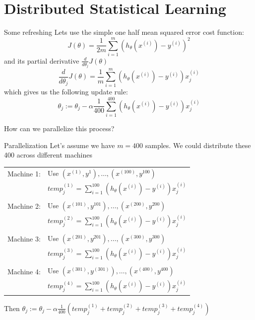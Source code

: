 \documentclass{beamer}
\begin{document}
\section{Distributed Statistical Learning}
\label{sec:distributed_statistical_learning}

\begin{frame}{Some refreshing}
  \tiny
  Lets use the simple one half mean squared error cost function: 
  \begin{equation}
    J(\theta) = \frac{1}{2m} \sum^m_{i=1} (h_{\theta}(x^{(i)}) - y^{(i)})^2
  \end{equation}
  and its partial derivative $\frac{d}{d\theta_j}J(\theta)$
  \begin{equation}
    \frac{d}{d\theta_j}J(\theta) = \frac{1}{m}\sum^{m}_{i=1}(h_{\theta}(x^{(i)})- y^{(i)})x_j^{(i)}
  \end{equation}
  which gives us the following update rule:
  \begin{equation}
    \theta_j := \theta_j - \alpha \frac{1}{400}\sum^{400}_{i=1}(h_{\theta}(x^{(i)})- y^{(i)})x_j^{(i)}
  \end{equation}

  {\large How can we parallelize this process?}

\end{frame}

\begin{frame}[t]{Parallelization}
  \small
  Let's assume we have $m=400$ samples. We could distribute these 400 across different machines

  \begin{tabular}{ll}
    Machine 1: & Use $(x^{(1)}, y^{1}),\ldots, (x^{(100)}, y^{100})$ \\
      & $temp_j^{(1)} = \sum^{100}_{i=1}(h_{\theta}(x^{(i)})- y^{(i)})x_j^{(i)}$ \\
      & \\
    Machine 2: & Use $(x^{(101)}, y^{101}),\ldots, (x^{(200)}, y^{200})$ \\
      & $temp_j^{(2)} = \sum^{100}_{i=1}(h_{\theta}(x^{(i)})- y^{(i)})x_j^{(i)}$ \\
      & \\
    Machine 3: & Use $(x^{(201)}, y^{201}),\ldots, (x^{(300)}, y^{300})$ \\
      & $temp_j^{(3)} = \sum^{100}_{i=1}(h_{\theta}(x^{(i)})- y^{(i)})x_j^{(i)}$ \\
      & \\
    Machine 4: & Use $(x^{(301)}, y^{(301)}),\ldots, (x^{(400)}, y^{400})$ \\
      & $temp_j^{(4)} = \sum^{100}_{i=1}(h_{\theta}(x^{(i)})- y^{(i)})x_j^{(i)}$
  \end{tabular}

  Then $\theta_j := \theta_j - \alpha \frac{1}{400} (temp^{(1)}_j  + temp^{(2)}_j  + temp^{(3)}_j  + temp^{(4)}_j )$
  
\end{frame}
\end{document}
